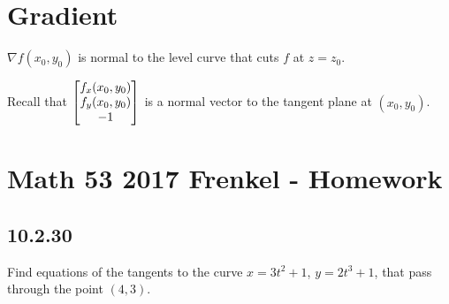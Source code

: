 \documentclass[12pt]{article}
\begin{document}
\section*{Gradient}
$\nabla f(x_0, y_0)$ is normal to the level curve that cuts $f$ at $z = z_0$.

Recall that $\begin{bmatrix}f_x(x_0,y_0)\\f_y(x_0,y_0)\\-1\end{bmatrix}$ is a normal vector to the
tangent plane at $(x_0,y_0)$.

\newpage
\section*{Math 53 2017 Frenkel - Homework}

\subsection*{10.2.30}
Find equations of the tangents to the curve $x = 3t^2 + 1$, $y = 2t^3 + 1$,
that pass through the point $(4, 3)$.
\end{document}
